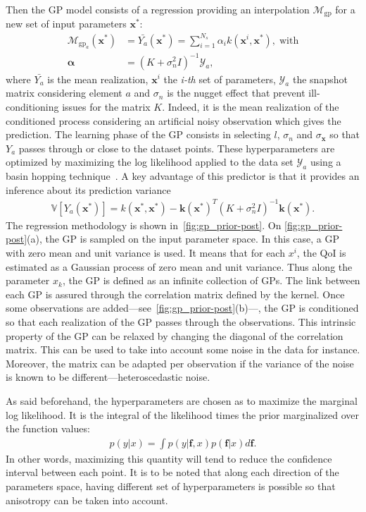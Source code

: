 Then the GP model consists of a regression providing an interpolation $\mathcal{M}_{\text{gp}}$ for a new set of input parameters $\mathbf{x^{*}}$:
\begin{align}
\mathcal{M}_{\text{gp}_{a}}(\mathbf{x}^*)&=\bar{Y_{a}}(\mathbf{x}^*) =  \sum_{i = 1}^{N_s}\alpha_i k (\mathbf{x}^i, \mathbf{x}^*), \;\text{with} \\
\mathbf{\alpha} &= (K + \sigma_n^2 I)^{-1}\mathcal{Y}_a, \nonumber
\end{align}
where $\bar{Y_a}$ is the mean realization, $\mathbf{x}^i$ the \textit{i-th} set of parameters, $\mathcal{Y}_{a}$ the snapshot matrix considering element $a$ and $\sigma_n$ is the nugget effect that prevent ill-conditioning issues for the matrix $K$. Indeed, it is the mean realization of the conditioned process considering an artificial noisy observation which gives the prediction. The learning phase of the GP consists in selecting $l$, $\sigma_n$ and $\sigma_\mathbf{x}$ so that $Y_a$ passes through or close to the dataset points. These hyperparameters are optimized by maximizing the log likelihood applied to the data set $\mathcal{Y}_a$ using a basin hopping technique~\citep{wales1997}. A key advantage of this predictor is that it provides an inference about its prediction variance
\begin{align}
\mathbb{V}[Y_{a}(\mathbf{x}^*)] = k(\mathbf{x}^*, \mathbf{x}^*)-\mathbf{k}(\mathbf{x}^*)^T(K + \sigma_n^2 I)^{-1}\mathbf{k}(\mathbf{x}^*).
\end{align}
The regression methodology is shown in~\cref{fig:gp_prior-post}. On \cref{fig:gp_prior-post}(a), the GP is sampled on the input parameter space. In this case, a GP with zero mean and unit variance is used. It means that for each $x^i$, the QoI is estimated as a Gaussian process of zero mean and unit variance. Thus along the parameter $x_{k}$, the GP is defined as an infinite collection of GPs. The link between each GP is assured through the correlation matrix defined by the kernel. Once some observations are added---see~\cref{fig:gp_prior-post}(b)---, the GP is conditioned so that each realization of the GP passes through the observations. This intrinsic property of the GP can be relaxed by changing the diagonal of the correlation matrix. This can be used to take into account some noise in the data for instance. Moreover, the matrix can be adapted per observation if the variance of the noise is known to be different---heteroscedastic noise.

As said beforehand, the hyperparameters are chosen as to maximize the marginal log likelihood. It is the integral of the likelihood times the prior marginalized over the function values:
\begin{align}
p(y|x) = \int p(y|\mathbf{f}, x)p(\mathbf{f}|x)d\mathbf{f}.
\end{align}
\noindent In other words, maximizing this quantity will tend to reduce the confidence interval between each point. It is to be noted that along each direction of the parameters space, having different set of hyperparameters  is possible so that anisotropy can be taken into account.

